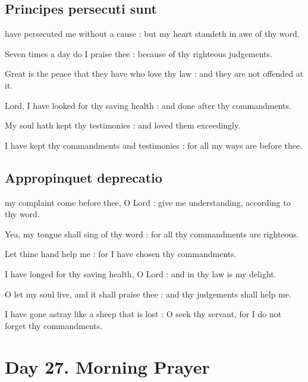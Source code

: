 \subsection{Principes persecuti sunt}
 have persecuted me without a cause : but my heart standeth in awe of thy word.\par
{}
Seven times a day do I praise thee : because of thy righteous judgements.\par
{}Great is the peace that they have who love thy law : and they are not offended at it.\par
{}Lord, I have looked for thy saving health : and done after thy commandments.\par
{}My soul hath kept thy testimonies : and loved them exceedingly.\par
{}I have kept thy commandments and testimonies : for all my ways are before thee.\par

\subsection{Appropinquet deprecatio}
 my complaint come before thee, O Lord : give me understanding, according to thy word.\par
{}
Yea, my tongue shall sing of thy word : for all thy commandments are righteous.\par
{}Let thine hand help me : for I have chosen thy commandments.\par
{}I have longed for thy saving health, O Lord : and in thy law is my delight.\par
{}O let my soul live, and it shall praise thee : and thy judgements shall help me.\par
{}I have gone astray like a sheep that is lost : O seek thy servant, for I do not forget thy commandments.\par

\section*{Day 27. Morning Prayer}


